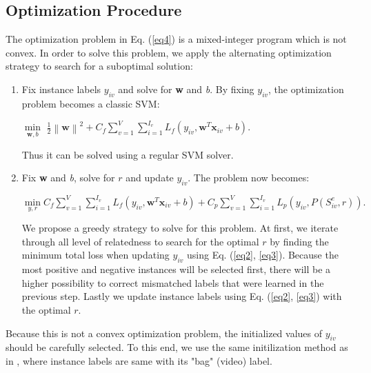 \subsection{Optimization Procedure}
The optimization problem in Eq. (\ref{eq4}) is a mixed-integer program which is not convex. In order to solve this problem, we apply the alternating optimization strategy to search for a suboptimal solution:
\begin{enumerate}
	\item{} Fix instance labels $y_{iv}$ and solve for \textbf{w} and \textit{b}. By fixing $y_{iv}$, the optimization problem becomes a classic SVM:
	
	$\min\limits_{\textbf{w},b}$ $\frac{1}{2} \left \| \textbf{w} \right \|^{2} + C_{f} \sum_{v=1}^{V}\sum_{i=1}^{I_{v}}L_{f}\left ( y_{iv}, \textbf{w}^{T}\textbf{x}_{iv}+b \right )$. 
	
	Thus it can be solved using a regular SVM solver.
	
	\item{} Fix \textbf{w} and \textit{b}, solve for $r$ and update $y_{iv}$. The problem now becomes: 
	
	$\min\limits_{y,r} C_{f} \sum_{v=1}^{V}\sum_{i=1}^{I_{v}}L_{f}\left ( y_{iv}, \textbf{w}^{T}\textbf{x}_{iv}+b \right ) 
	+ C_{p} \sum_{v=1}^{V}\sum_{i=1}^{I_{v}}L_{p}\left ( y_{iv}, P(S_{iv}^{e},r) \right ).$
	
	We propose a greedy strategy to solve for this problem. At first, we iterate through all level of relatedness to search for the optimal $r$ by finding the minimum total loss when updating $y_{iv}$ using Eq. (\ref{eq2}, \ref{eq3}). Because the most positive and negative instances will be selected first, there will be a higher possibility to correct mismatched labels that were learned in the previous step. Lastly we update instance labels using Eq. (\ref{eq2}, \ref{eq3}) with the optimal $r$.
	
\end{enumerate}

Because this is not a convex optimization problem, the initialized values of $y_{iv}$ should be carefully selected. To this end, we use the same initilization method as in \cite{andrews2002support,lai2014video}, where instance labels are same with its "bag" (video) label. 

